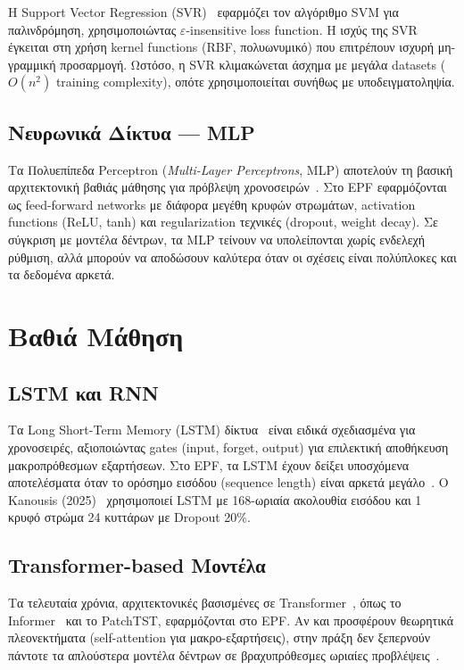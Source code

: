 Η Support Vector Regression (SVR)~\cite{smola2004} εφαρμόζει τον αλγόριθμο SVM για παλινδρόμηση,
χρησιμοποιώντας $\varepsilon$-insensitive loss function. Η ισχύς της SVR έγκειται στη χρήση
kernel functions (RBF, πολυωνυμικό) που επιτρέπουν ισχυρή μη-γραμμική προσαρμογή. Ωστόσο, η SVR
κλιμακώνεται άσχημα με μεγάλα datasets ($O(n^2)$ training complexity), οπότε χρησιμοποιείται
συνήθως με υποδειγματοληψία.

\subsection{Νευρωνικά Δίκτυα --- MLP}

Τα Πολυεπίπεδα Perceptron (\textit{Multi-Layer Perceptrons}, MLP) αποτελούν τη βασική αρχιτεκτονική
βαθιάς μάθησης για πρόβλεψη χρονοσειρών~\cite{goodfellow2016deep}. Στο EPF εφαρμόζονται ως
feed-forward networks με διάφορα μεγέθη κρυφών στρωμάτων, activation functions (ReLU, tanh) και
regularization τεχνικές (dropout, weight decay). Σε σύγκριση με μοντέλα δέντρων, τα MLP τείνουν να
υπολείπονται χωρίς ενδελεχή ρύθμιση, αλλά μπορούν να αποδώσουν καλύτερα όταν οι σχέσεις είναι
πολύπλοκες και τα δεδομένα αρκετά.


\section{Βαθιά Μάθηση}
\label{sec:deep_learning}

\subsection{LSTM και RNN}

Τα Long Short-Term Memory (LSTM) δίκτυα~\cite{hochreiter1997lstm} είναι ειδικά σχεδιασμένα για
χρονοσειρές, αξιοποιώντας gates (input, forget, output) για επιλεκτική αποθήκευση μακροπρόθεσμων
εξαρτήσεων. Στο EPF, τα LSTM έχουν δείξει υποσχόμενα αποτελέσματα όταν το ορόσημο εισόδου (sequence
length) είναι αρκετά μεγάλο~\cite{kanousis2025}. Ο Kanousis (2025)~\cite{kanousis2025} χρησιμοποιεί
LSTM με 168-ωριαία ακολουθία εισόδου και 1 κρυφό στρώμα 24 κυττάρων με Dropout 20\%.

\subsection{Transformer-based Μοντέλα}

Τα τελευταία χρόνια, αρχιτεκτονικές βασισμένες σε Transformer~\cite{vaswani2017attention}, όπως το
Informer~\cite{zhou2021informer} και το PatchTST, εφαρμόζονται στο EPF. Αν και προσφέρουν
θεωρητικά πλεονεκτήματα (self-attention για μακρο-εξαρτήσεις), στην πράξη δεν ξεπερνούν πάντοτε τα
απλούστερα μοντέλα δέντρων σε βραχυπρόθεσμες ωριαίες προβλέψεις~\cite{zeng2023transformers}.


